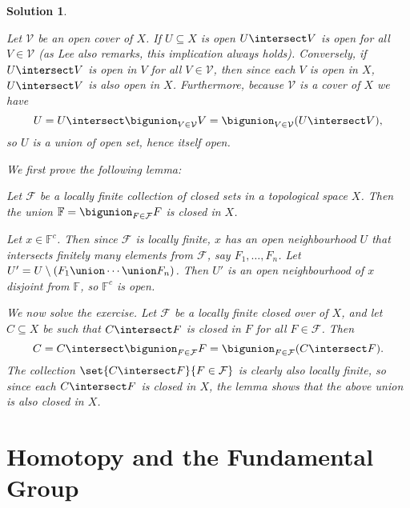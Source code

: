 \documentclass[article, a4paper, 11pt, oneside]{memoir}
\numberwithin{equation}{chapter}
\theoremstyle{nonumberplain}
\newtheorem{solution}{Solution}
\newenvironment{displaytheorem}{%
	\begin{displayquote}\itshape%
}{%
	\end{displayquote}%
}
\newcommand{\calV}{\mathcal{V}}
\newcommand{\calF}{\mathcal{F}}
\newcommand{\bbF}{\mathbb{F}}
\begin{document}
\begin{solution}
\begin{solutionsec}
    \item Let $\calV$ be an open cover of $X$. If $U \subseteq X$ is open $U \intersect V$ is open for all $V \in \calV$ (as Lee also remarks, this implication always holds). Conversely, if $U \intersect V$ is open in $V$ for all $V \in \calV$, then since each $V$ is open in $X$, $U \intersect V$ is also open in $X$. Furthermore, because $\calV$ is a cover of $X$ we have
    \begin{equation*}
        U
            = U \intersect \bigunion_{V \in \calV} V
            = \bigunion_{V \in \calV} (U \intersect V),
    \end{equation*}
    so $U$ is a union of open set, hence itself open.

    \item We first prove the following lemma:
    \begin{displaytheorem}
        Let $\calF$ be a locally finite collection of closed sets in a topological space $X$. Then the union $\bbF = \bigunion_{F \in \calF} F$ is closed in $X$.
    \end{displaytheorem}
    Let $x \in \bbF^c$. Then since $\calF$ is locally finite, $x$ has an open neighbourhood $U$ that intersects finitely many elements from $\calF$, say $F_1, \ldots, F_n$. Let $U' = U \setminus (F_1 \union \cdots \union F_n)$. Then $U'$ is an open neighbourhood of $x$ disjoint from $\bbF$, so $\bbF^c$ is open.
    
    We now solve the exercise. Let $\calF$ be a locally finite closed over of $X$, and let $C \subseteq X$ be such that $C \intersect F$ is closed in $F$ for all $F \in \calF$. Then
    \begin{equation*}
        C
            = C \intersect \bigunion_{F \in \calF} F
            = \bigunion_{F \in \calF} (C \intersect F).
    \end{equation*}
    The collection $\set{C \intersect F}{F \in \calF}$ is clearly also locally finite, so since each $C \intersect F$ is closed in $X$, the lemma shows that the above union is also closed in $X$.
\end{solutionsec}
\end{solution}



\addtocounter{chapter}{1}

\chapter{Homotopy and the Fundamental Group}
\end{document}
